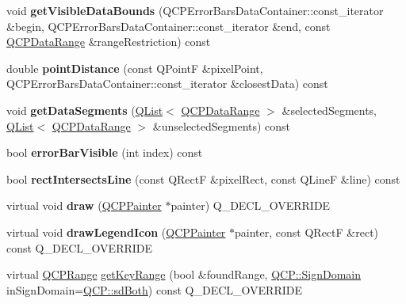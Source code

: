 \begin{DoxyCompactItemize}
void {\bfseries get\+Visible\+Data\+Bounds} (Q\+C\+P\+Error\+Bars\+Data\+Container\+::const\+\_\+iterator \&begin, Q\+C\+P\+Error\+Bars\+Data\+Container\+::const\+\_\+iterator \&end, const \hyperlink{class_q_c_p_data_range}{Q\+C\+P\+Data\+Range} \&range\+Restriction) const
\item 
\mbox{\label{class_q_c_p_error_bars_a8e904076bad643f43af28b95f21c1b88}} 
double {\bfseries point\+Distance} (const Q\+PointF \&pixel\+Point, Q\+C\+P\+Error\+Bars\+Data\+Container\+::const\+\_\+iterator \&closest\+Data) const
\item 
\mbox{\label{class_q_c_p_error_bars_a243e0bb2563fc2e9f08efd77e7175abf}} 
void {\bfseries get\+Data\+Segments} (\hyperlink{class_q_list}{Q\+List}$<$ \hyperlink{class_q_c_p_data_range}{Q\+C\+P\+Data\+Range} $>$ \&selected\+Segments, \hyperlink{class_q_list}{Q\+List}$<$ \hyperlink{class_q_c_p_data_range}{Q\+C\+P\+Data\+Range} $>$ \&unselected\+Segments) const
\item 
\mbox{\label{class_q_c_p_error_bars_a5ad9abccb1be3df25485ad7dc21b3b89}} 
bool {\bfseries error\+Bar\+Visible} (int index) const
\item 
\mbox{\label{class_q_c_p_error_bars_aa9b1642567a0aff8a2f6e0556c563633}} 
bool {\bfseries rect\+Intersects\+Line} (const Q\+RectF \&pixel\+Rect, const Q\+LineF \&line) const
\item 
\mbox{\label{class_q_c_p_error_bars_aa3fe7904b723ea98acd4ab21ddf9404b}} 
virtual void {\bfseries draw} (\hyperlink{class_q_c_p_painter}{Q\+C\+P\+Painter} $\ast$painter) Q\+\_\+\+D\+E\+C\+L\+\_\+\+O\+V\+E\+R\+R\+I\+DE
\item 
\mbox{\label{class_q_c_p_error_bars_af41ddd11b89881042a2ab19392d8a609}} 
virtual void {\bfseries draw\+Legend\+Icon} (\hyperlink{class_q_c_p_painter}{Q\+C\+P\+Painter} $\ast$painter, const Q\+RectF \&rect) const Q\+\_\+\+D\+E\+C\+L\+\_\+\+O\+V\+E\+R\+R\+I\+DE
\item 
virtual \hyperlink{class_q_c_p_range}{Q\+C\+P\+Range} \hyperlink{class_q_c_p_error_bars_aa8850872dd67af338e612427ec595a13}{get\+Key\+Range} (bool \&found\+Range, \hyperlink{namespace_q_c_p_afd50e7cf431af385614987d8553ff8a9}{Q\+C\+P\+::\+Sign\+Domain} in\+Sign\+Domain=\hyperlink{namespace_q_c_p_afd50e7cf431af385614987d8553ff8a9a3dee7e9cd2fedce9253b83e172626a6c}{Q\+C\+P\+::sd\+Both}) const Q\+\_\+\+D\+E\+C\+L\+\_\+\+O\+V\+E\+R\+R\+I\+DE

\end{DoxyCompactItemize}
